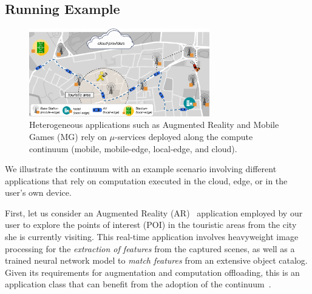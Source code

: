 
\subsection{Running Example}
\label{sub:example}

\begin{figure}[tbp]
	\includegraphics[width=0.7\textwidth]{figs/Continuum-Scenario}
	\setlength{\belowcaptionskip}{-8pt}
	\caption{Heterogeneous applications such as Augmented Reality and Mobile Games (MG) rely on $\mu$-services deployed along the compute continuum (mobile, mobile-edge, local-edge, and cloud).}
	\label{fig:continuum-scenario}
\end{figure}


We illustrate the continuum with an example scenario involving different applications that rely on computation executed in the cloud, edge, or in the user's own device.

First, let us consider an Augmented Reality (AR)~\cite{GarrigaMendonca2017} application employed by our user to 
explore the points of interest (POI) in the touristic areas from the city she is currently visiting.
This real-time application involves heavyweight image processing for the \textit{extraction of features} from the captured scenes, as well as a trained neural network model to \textit{match features} from an extensive object catalog. Given its requirements for augmentation and computation offloading, this is an application class that can benefit from the adoption of the continuum~\cite{beck2014mobile}.

